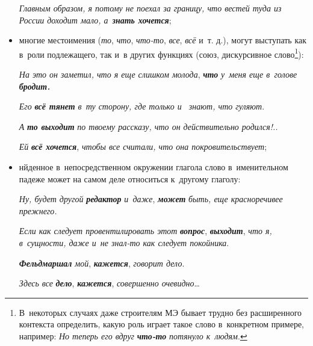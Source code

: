 \begin{multicols}{2}
\begin{itemize}
\textit{Главным образом, я потому не поехал за границу, что вестей туда 
из России доходит мало, а}~{\bfseries\textit{знать хочется}};
\item многие местоимения (\textit{то}, \textit{что}, 
\textit{что-то}, \textit{все}, \textit{всё} и~т. д.), могут 
выступать как в~роли подлежащего, так и~в других функциях (союз, 
дискурсивное слово\footnote[1]{В~некоторых случаях даже строителям МЭ 
бывает трудно без расширенного контекста определить, какую роль играет 
такое слово в~конкретном примере, например: \textit{Но теперь его вдруг} 
{\bfseries\textit{что-то}} \textit{потянуло к~людям}.}):

\textit{На это он заметил, что я еще слишком молода}, 
{\bfseries\textit{что}} \textit{у~меня еще в~голове} 
{\bfseries\textit{бродит.}} 

\textit{Его} {\bfseries\textit{всё тянет}} \textit{в~ту сторону, где только и~
знают, что гуляют}.

\textit{А} {\bfseries\textit{то выходит}} \textit{по твоему рассказу, что он 
действительно родился!..}

\textit{Ей} {\bfseries\textit{всё хочется}}, \textit{чтобы все считали, что 
она покровительствует};
\item нйденное в~непосредственном окружении глагола слово 
в~именительном падеже может на самом деле относиться к~другому глаголу:

\textit{Ну, будет другой} {\bfseries\textit{редактор}} \textit{и~даже}, 
{\bfseries\textit{может}} \textit{быть, еще красноречивее прежнего.}

\textit{Если как следует провентилировать этот} 
{\bfseries\textit{вопрос}}, {\bfseries\textit{выходит}}, \textit{что я, 
в~сущности, даже и~не знал-то как следует покойника}.

{\bfseries\textit{Фельдмаршал}} \textit{мой}, {\bfseries\textit{кажется}}, 
\textit{говорит дело}.

\textit{Здесь все} {\bfseries\textit{дело}}, {\bfseries\textit{кажется}}, 
\textit{совершенно очевидно}\ldots

\end{itemize}


\end{multicols}

